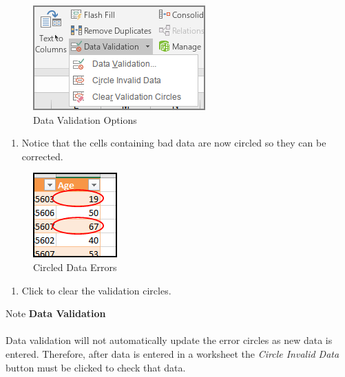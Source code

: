 \begin{figure}[H]
	\centering
	\includegraphics[width=\maxwidth{.50\linewidth}]{gfx/ch07_fig42}
	\caption{Data Validation Options}
	\label{07:fig42}
\end{figure}

\begin{enumerate}[resume]	
	\item Notice that the cells containing bad data are now circled so they can be corrected.
\end{enumerate}

\begin{figure}[H]
	\centering
	\includegraphics[width=\maxwidth{.95\linewidth}]{gfx/ch07_fig43}
	\caption{Circled Data Errors}
	\label{07:fig43}
\end{figure}

\begin{enumerate}[resume]	
	\item Click  to clear the validation circles.
\end{enumerate}

\begin{center}
	\begin{infobox}{Note}
		\textbf{Data Validation}
		\\
		\\
		Data validation will not automatically update the error circles as new data is entered. Therefore, after data is entered in a worksheet the \textit{Circle Invalid Data} button must be clicked to check that data.
	\end{infobox}
\end{center}

